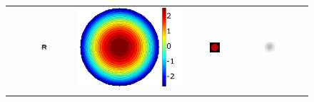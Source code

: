 \begin{figure}[h]
\begin{tabular}{@{}r@{ } c@{ } c@{ } c@{ } c@{ } c }
	\begin{sideways} \parbox[b]{25mm} {} \end{sideways} &
	\includegraphics[width= 0.22\textwidth]{__Images/05/synthetic_sims/R_20-200@4x.png} &
	\includegraphics[height=0.22\textwidth]{__Images/05/synthetic_sims/Wavefront_6D,0@0.png} &
	\includegraphics[width= 0.22\textwidth]{__Images/05/synthetic_sims/PSF_6D,0@0.png} &
	\includegraphics[width= 0.22\textwidth]{__Images/05/synthetic_sims/R_20-200_f50_simulated(6D,0@0).png}				\\ \\
	

\end{tabular}
\end{figure}
